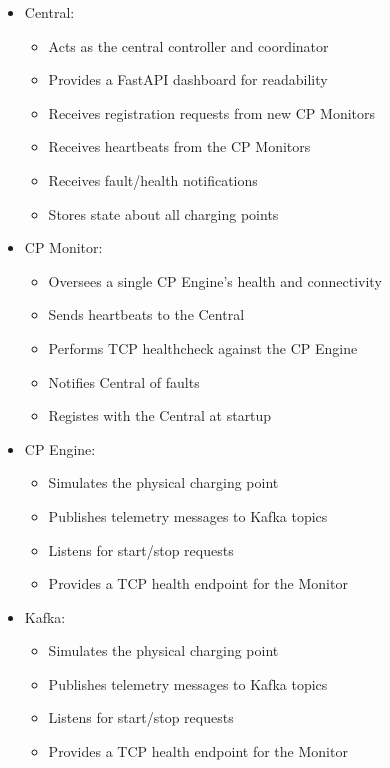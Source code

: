 \documentclass[12pt,a4paper]{article}
\begin{document}
\begin{itemize}
    \item Central:
        \begin{itemize}
            \item Acts as the central controller and coordinator
            \item Provides a FastAPI dashboard for readability
            \item Receives registration requests from new CP Monitors
            \item Receives heartbeats from the CP Monitors
            \item Receives fault/health notifications
            \item Stores state about all charging points 
        \end{itemize}
    \item CP Monitor:
        \begin{itemize}
            \item Oversees a single CP Engine's health and connectivity
            \item Sends heartbeats to the Central
            \item Performs TCP healthcheck against the CP Engine
            \item Notifies Central of faults
            \item Registes with the Central at startup
        \end{itemize}
    \item CP Engine:
        \begin{itemize}
            \item Simulates the physical charging point
            \item Publishes telemetry messages to Kafka topics
            \item Listens for start/stop requests
            \item Provides a TCP health endpoint for the Monitor
        \end{itemize}
    \item Kafka:
        \begin{itemize}
            \item Simulates the physical charging point
            \item Publishes telemetry messages to Kafka topics
            \item Listens for start/stop requests
            \item Provides a TCP health endpoint for the Monitor

\end{itemize}
\end{itemize}
\end{document}
